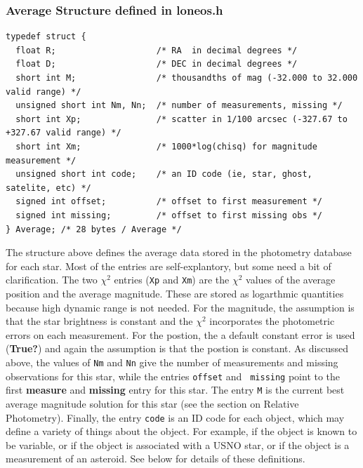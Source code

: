 \documentclass{article}
\newcommand{\note}[1]{({\bf #1})}
\begin{document}
\subsubsection*{Average Structure defined in loneos.h}
\begin{verbatim}
typedef struct {
  float R;                    /* RA  in decimal degrees */
  float D;                    /* DEC in decimal degrees */
  short int M;                /* thousandths of mag (-32.000 to 32.000 valid range) */
  unsigned short int Nm, Nn;  /* number of measurements, missing */
  short int Xp;               /* scatter in 1/100 arcsec (-327.67 to +327.67 valid range) */
  short int Xm;               /* 1000*log(chisq) for magnitude measurement */
  unsigned short int code;    /* an ID code (ie, star, ghost, satelite, etc) */
  signed int offset;          /* offset to first measurement */
  signed int missing;         /* offset to first missing obs */
} Average; /* 28 bytes / Average */
\end{verbatim}
The structure above defines the average data stored in the photometry
database for each star.  Most of the entries are self-explantory, but
some need a bit of clarification.  The two $\chi^2$ entries ({\tt Xp}
and {\tt Xm}) are the $\chi^2$ values of the average position and the
average magnitude.  These are stored as logarthmic quantities because
high dynamic range is not needed.  For the magnitude, the assumption
is that the star brightness is constant and the $\chi^2$ incorporates
the photometric errors on each measurement.  For the postion, the
a default constant error is used \note{True?} and again the assumption
is that the postion is constant.  As discussed above, the values of
{\tt Nm} and {\tt Nn} give the number of measurements and missing
observations for this star, while the entries {\tt offset} and {\tt
  missing} point to the first {\bf measure} and {\bf missing} entry
for this star.  The entry {\tt M} is the current best average
magnitude solution for this star (see the section on Relative
Photometry).  Finally, the entry {\tt code} is an ID code for each
object, which may define a variety of things about the object.  For
example, if the object is known to be variable, or if the object is
associated with a USNO star, or if the object is a measurement of an
asteroid.  See below for details of these definitions.
\end{document}
